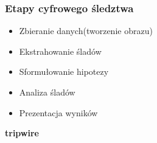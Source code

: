 \subsubsection{Etapy cyfrowego śledztwa}

\begin{itemize}
	\item Zbieranie danych(tworzenie obrazu)
	\item Ekstrahowanie śladów
	\item Sformułowanie hipotezy
	\item Analiza śladów
	\item Prezentacja wyników \\
\end{itemize}

\centerline{\textbf{tripwire}}
